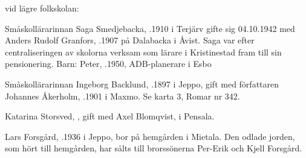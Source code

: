  vid lägre folkskolan:

%
Småskollärarinnan Saga Smedjebacka, .1910 i Terjärv gifte sig 04.10.1942 med Anders Rudolf Granfors, .1907 på Dalabacka i Åvist. Saga var efter centraliseringen av skolorna verksam som lärare i Kristinestad fram till sin pensionering.
Barn: Peter, .1950, ADB-planerare i Esbo


%
Småskollärarinnan Ingeborg Backlund, .1897 i Jeppo, gift med författaren Johannes Åkerholm, .1901 i Maxmo. Se karta 3, Romar nr 342.
\begin{jhchildren}
  \item {}
  \item {}
  \item {}
\end{jhchildren}


%
Katarina Storsved, , gift med Axel Blomqvist,  i Pensala.
\begin{jhchildren}
  \item {}
  \item {}
  \item {}
  \item {}
\end{jhchildren}



%



%
Lars Forsgård, .1936 i Jeppo, bor på hemgården i Mietala. Den odlade jorden, som hört till hemgården, har sålts till brorssönerna Per-Erik och Kjell Forsgård.

